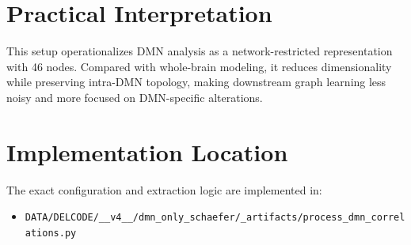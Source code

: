 \documentclass[11pt]{article}
\begin{document}
\section*{Practical Interpretation}
This setup operationalizes DMN analysis as a network-restricted representation with 46 nodes. Compared with whole-brain modeling, it reduces dimensionality while preserving intra-DMN topology, making downstream graph learning less noisy and more focused on DMN-specific alterations.

\section*{Implementation Location}
The exact configuration and extraction logic are implemented in:
\begin{itemize}
\item \texttt{DATA/DELCODE/\_\_v4\_\_/dmn\_only\_schaefer/\_artifacts/process\_dmn\_correlations.py}
\end{itemize}
\end{document}
